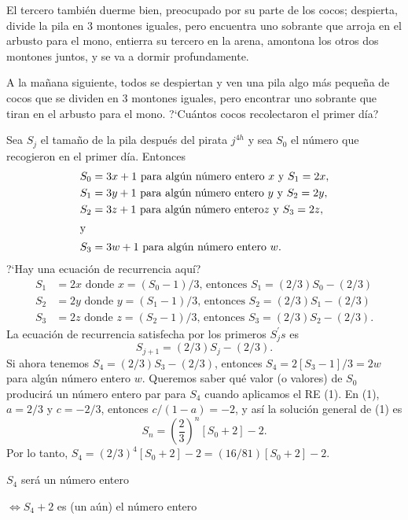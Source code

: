 El tercero también duerme bien, preocupado por su parte de los cocos; despierta, divide la pila en 3 montones iguales, pero encuentra uno sobrante que arroja en el arbusto para el mono, entierra su tercero en la arena, amontona los otros dos montones juntos, y se va a dormir profundamente.

A la mañana siguiente, todos se despiertan y ven una pila algo más pequeña de cocos que se dividen en 3 montones iguales, pero encontrar uno sobrante que tiran en el arbusto para el mono. ?`Cuántos cocos recolectaron el primer día?

Sea $S_{j}$ el tamaño de la pila después del pirata $j^{4h}$ y sea $S_{0}$ el número que recogieron en el primer día. Entonces
\begin{align*}
	S_{0}&=3x+1\text{ para algún número entero }x\text{ y }S_1=2x,\\
	S_{1}&= 3y+1\text{ para algún número entero }y\text{ y }S_2=2y,\\
	S_{2}&=3z+1\text{ para algún número entero}z\text{ y }S_3=2z,\\
	\intertext{y}
	S_{3}&=3w+1\text{ para algún número entero }w.
\end{align*}
?`Hay una ecuación de recurrencia aquí?
\begin{align*}
	S_{1}&=2x\text{ donde }x=(S_{0}-1)/3\text{, entonces }S_{1}=(2/3)S_0-(2/3)\\
	S_{2}&=2y\text{ donde }y=(S_{1}-1)/3\text{, entonces }S_{2}=(2/3)S_1-(2/3)\\
	S_{3}&=2z\text{ donde }z=(S_{2}-1)/3\text{, entonces }S_{3}=(2/3)S_2-(2/3).
\end{align*}
La ecuación de recurrencia satisfecha por los primeros $S_{j}^{\prime}s$ es
\begin{equation}
	S_{j+1}=(2/3)S_{j}-(2/3).
\end{equation}
Si ahora tenemos $S_{4}=(2/3)S_{3}-(2/3)$, entonces $S_{4}=2[S_{3}-1]/3=2w$ para algún número entero $w$. Queremos saber qué valor (o valores) de $S_0$ producirá un número entero par para $S_4$ cuando aplicamos el RE (1). En (1), $a=2/3$ y $c=-2/3$, entonces $c/(1-a) = -2$, y así la solución general de (1) es
\begin{equation*}
	S_{n}={\left(\frac{2}{3}\right)}^{n}\left[S_{0}+2\right]-2.
\end{equation*}
Por lo tanto, $S_{4}=(2/3)^{4}[S_0+2]-2=(16/81)\left[S_0 + 2\right]-2$.

$S_{4}$ será un número entero

$\Leftrightarrow S_{4}+2$ es (un aún) el número entero

